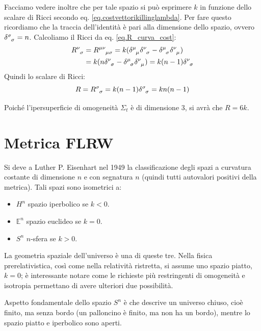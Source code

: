 Facciamo vedere inoltre che per tale spazio si può esprimere $k$ in funzione dello scalare di Ricci secondo eq. \ref{eq.costvettorikillinglambda}. Per fare questo ricordiamo che la traccia dell'identità è pari alla dimensione dello spazio, ovvero $\tensor{\delta}{^\sigma_\sigma} = n$. Calcoliamo il Ricci da eq. \ref{eq.R_curva_cost}:
\begin{align*}
    \tensor{R}{^\nu_\sigma} &= \tensor{R}{^{\mu\nu}_{\mu\sigma}} = k(\tensor{\delta}{^\mu_\mu}\tensor{\delta}{^\nu_\sigma} - \tensor{\delta}{^\mu_\sigma}\tensor{\delta}{^\nu_\mu}) \\
    &= k(n\tensor{\delta}{^\nu_\sigma} - \tensor{\delta}{^\mu_\sigma}\tensor{\delta}{^\nu_\mu}) =k(n-1)\tensor{\delta}{^\nu_\sigma}
\end{align*}
Quindi lo scalare di Ricci:
\begin{equation*}
    R = \tensor{R}{^\sigma_\sigma} = k(n-1)\tensor{\delta}{^\sigma_\sigma} = k n(n-1)
\end{equation*}

Poiché l'ipersuperficie di omogeneità $\Sigma_t$ è di dimensione 3, si avrà che $R=6k$.
\section{Metrica FLRW}

Si deve a Luther P. Eisenhart nel 1949 la classificazione degli spazi a curvatura costante di dimensione $n$ e con segnatura $n$ (quindi tutti autovalori positivi della metrica). Tali spazi sono isometrici a:
\begin{itemize}
    \item $H^n$ spazio iperbolico se $k<0$.
    \item $\mathbb{E}^n$ spazio euclideo se $k=0$.
    \item $S^n$ $n$-sfera se $k>0$.
\end{itemize}
La geometria spaziale dell'universo è una di queste tre. Nella fisica prerelativistica, così come nella relatività ristretta, si assume uno spazio piatto, $k=0$; è interessante notare come le richieste più restringenti di omogeneità e isotropia permettano di avere ulteriori due possibilità.

Aspetto fondamentale dello spazio $S^n$ è che descrive un universo chiuso, cioè finito, ma senza bordo (un palloncino è finito, ma non ha un bordo), mentre lo spazio piatto e iperbolico sono aperti.

